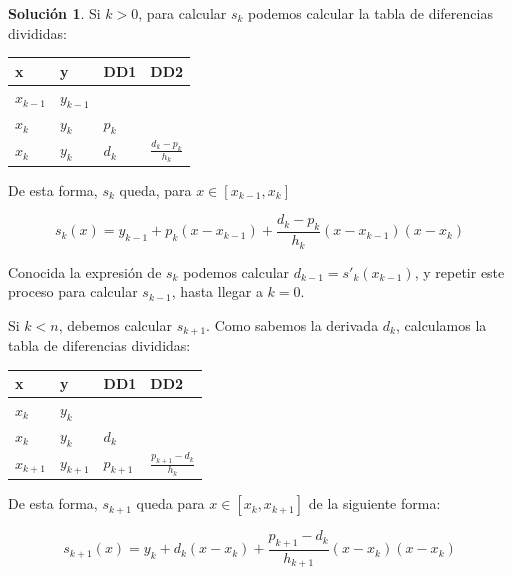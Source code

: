 \documentclass[11pt,spanish,]{article}
\theoremstyle{definition} \newtheorem*{definicion}{Definición}
\newtheorem*{solucion}{Solución}
\begin{document}
\begin{solucion}
Si $k > 0$, para calcular $s_k$ podemos calcular la tabla de diferencias divididas:
\begin{table}[h]
\centering
\begin{tabular}{llll}
x & y & DD1 & DD2\\
\hline
$x_{k-1}$ & $y_{k-1}$ & & \\
$x_k$ & $y_k$ & $p_k$ & \\
$x_k$ & $y_k$ & $d_k$ & $\frac{d_k-p_k}{h_k}$\\
\hline
\end{tabular}
\end{table}

\vspace*{2\baselineskip}
De esta forma, $s_k$ queda, para $x \in [x_{k-1}, x_k]$

\begin{equation} \label{eq:sk}
s_k(x)=y_{k-1}+p_k(x-x_{k-1})+\frac{d_k-p_k}{h_k}(x-x_{k-1})(x-x_k)
\end{equation}

Conocida la expresión de $s_k$ podemos calcular $d_{k-1} = s'_k(x_{k-1})$, y repetir
este proceso para calcular $s_{k-1}$, hasta llegar a $k = 0$.


Si $k < n$, debemos calcular $s_{k+1}$. Como sabemos la derivada $d_k$, calculamos la tabla de diferencias divididas:

\vspace*{2\baselineskip}

\begin{table}[h]
\centering
\begin{tabular}{llll}
x & y & DD1 & DD2\\
\hline
$x_k$ & $y_k$ & & \\
$x_k$ & $y_k$ & $d_k$ & \\
$x_{k+1}$ & $y_{k+1}$ & $p_{k+1}$ & $\frac{p_{k+1}-d_k}{h_k}$ \\
\hline
\end{tabular}
\end{table}

\vspace*{2\baselineskip}

De esta forma, $s_{k+1}$ queda para $x \in [x_k, x_{k+1}]$ de la siguiente forma:

\begin{equation} \label{eq:skmas}
s_{k+1}(x)=y_k+d_k(x-x_k)+\frac{p_{k+1}-d_k}{h_{k+1}}(x-x_k)(x-x_k)
\end{equation}



\end{solucion}
\end{document}
